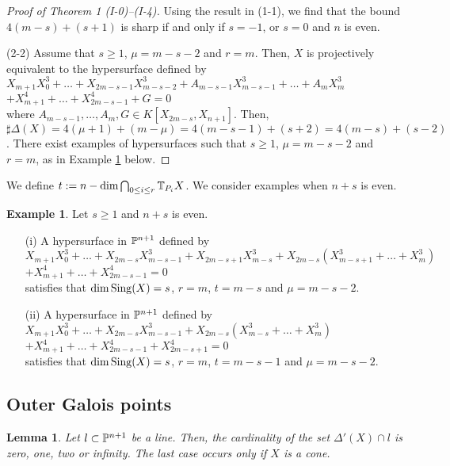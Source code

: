 \documentclass[10pt,oneside]{amsart}
\newtheorem{lemma}{Lemma}
\theoremstyle{definition}
\newtheorem{example}{Example}
\begin{document}
\begin{proof}[Proof of Theorem 1 (I-0)--(I-4)]
Using the result in (1-1), we find that the bound $4(m-s)+(s+1)$ is sharp if and only if $s=-1$, or $s=0$ and $n$ is even. 

(2-2) Assume that $s \ge 1$, $\mu=m-s-2$ and $r=m$. 
Then, $X$ is projectively equivalent to the hypersurface defined by \\
 $X_{m+1}X_0^3+\dots+X_{2m-s-1}X_{m-s-2}^3+A_{m-s-1}X_{m-s-1}^3+\dots+A_mX_m^3$ \\
\hspace{80mm} $+X_{m+1}^4+\dots+X_{2m-s-1}^4+G =0 $ \\
where $A_{m-s-1}, \ldots, A_m, G \in K[X_{2m-s}, X_{n+1}]$. 
Then, $\sharp\Delta(X)=4(\mu+1)+(m-\mu)=4(m-s-1)+(s+2)=4(m-s)+(s-2)$. 
There exist examples of hypersurfaces such that $s \ge 1$, $\mu=m-s-2$ and $r=m$, as in Example \ref{n+s:even} below. 
\end{proof}

We define $t:=n-\dim \bigcap_{0 \le i \le r}\Bbb T_{P_i}X$. 
We consider examples when $n+s$ is even. 

\begin{example} \label{n+s:even}
Let $s \ge 1$ and $n+s$ is even. 
\begin{itemize}
\item[(i)] A hypersurface in $\Bbb P^{n+1}$ defined by \\
$X_{m+1}X_0^3+\dots+X_{2m-s}X_{m-s-1}^3+X_{2m-s+1}X_{m-s}^3+X_{2m-s}(X_{m-s+1}^3+\dots+X_m^3)$  \\
\hspace{90mm} $+X_{m+1}^4+\dots+X_{2m-s-1}^4=0$ \\
satisfies that $\dim {\rm Sing}(X)=s$, $r=m$, $t=m-s$ and $\mu=m-s-2$. 
\item[(ii)] A hypersurface in $\Bbb P^{n+1}$ defined by \\
$X_{m+1}X_0^3+\dots+X_{2m-s}X_{m-s-1}^3+X_{2m-s}(X_{m-s}^3+\dots+X_m^3)$ \\
\hspace{70mm} $+X_{m+1}^4+\dots+X_{2m-s-1}^4+X_{2m-s+1}^4=0 $ \\
satisfies that $\dim {\rm Sing}(X)=s$, $r=m$, $t=m-s-1$ and $\mu=m-s-2$. 
\end{itemize}
\end{example}

\subsection{Outer Galois points} 

\begin{lemma} \label{OuterCollinearGaloisPoints}
Let $l \subset \Bbb P^{n+1}$ be a line. 
Then, the cardinality of the set $\Delta'(X) \cap l$ is zero, one, two or infinity. 
The last case occurs only if $X$ is a cone. 
\end{lemma} 
\end{document}
